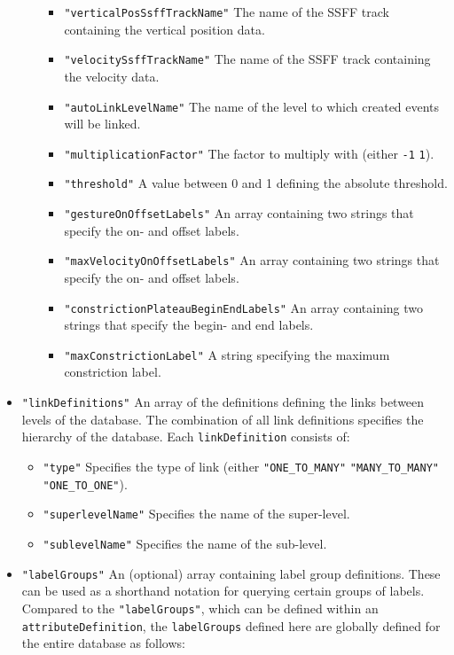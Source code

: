 \documentclass[]{book}
\begin{document}
\begin{itemize}
\begin{itemize}
    \begin{itemize}
    \item
      \texttt{"verticalPosSsffTrackName"} The name of the
      SSFF
      track containing the vertical position data.
    \item
      \texttt{"velocitySsffTrackName"} The name of the
      SSFF
      track containing the velocity data.
    \item
      \texttt{"autoLinkLevelName"} The name of the level to which created
      events will be linked.
    \item
      \texttt{"multiplicationFactor"} The factor to multiply with (either
      \texttt{-1} \texttt{1}).
    \item
      \texttt{"threshold"} A value between 0 and 1 defining the absolute
      threshold.
    \item
      \texttt{"gestureOnOffsetLabels"} An array containing two strings
      that specify the on- and offset labels.
    \item
      \texttt{"maxVelocityOnOffsetLabels"} An array containing two
      strings that specify the on- and offset labels.
    \item
      \texttt{"constrictionPlateauBeginEndLabels"} An array containing
      two strings that specify the begin- and end labels.
    \item
      \texttt{"maxConstrictionLabel"} A string specifying the maximum
      constriction label.
    \end{itemize}
  \end{itemize}
\item
  \texttt{"linkDefinitions"} An array of the definitions defining the links
  between levels of the database. The combination of all link
  definitions specifies the hierarchy of the database. Each
  \texttt{linkDefinition} consists of:

  \begin{itemize}
  \item
    \texttt{"type"} Specifies the type of link (either \texttt{"ONE\_TO\_MANY"}
    \texttt{"MANY\_TO\_MANY"} \texttt{"ONE\_TO\_ONE"}).
  \item
    \texttt{"superlevelName"} Specifies the name of the super-level.
  \item
    \texttt{"sublevelName"} Specifies the name of the sub-level.
  \end{itemize}
\item
  \texttt{"labelGroups"} An (optional) array containing label group
  definitions. These can be used as a shorthand notation for querying
  certain groups of labels. Compared to the \texttt{"labelGroups"}, which can
  be defined within an \texttt{attributeDefinition}, the \texttt{labelGroups}
  defined here are globally defined for the entire database as
  follows:


\end{itemize}
\end{document}
